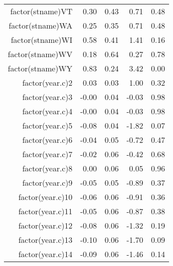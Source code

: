 \begin{table}[ht]
\begin{tabular}{rrrrr}
  factor(stname)VT & 0.30 & 0.43 & 0.71 & 0.48 \\ 
  factor(stname)WA & 0.25 & 0.35 & 0.71 & 0.48 \\ 
  factor(stname)WI & 0.58 & 0.41 & 1.41 & 0.16 \\ 
  factor(stname)WV & 0.18 & 0.64 & 0.27 & 0.78 \\ 
  factor(stname)WY & 0.83 & 0.24 & 3.42 & 0.00 \\ 
  factor(year.c)2 & 0.03 & 0.03 & 1.00 & 0.32 \\ 
  factor(year.c)3 & -0.00 & 0.04 & -0.03 & 0.98 \\ 
  factor(year.c)4 & -0.00 & 0.04 & -0.03 & 0.98 \\ 
  factor(year.c)5 & -0.08 & 0.04 & -1.82 & 0.07 \\ 
  factor(year.c)6 & -0.04 & 0.05 & -0.72 & 0.47 \\ 
  factor(year.c)7 & -0.02 & 0.06 & -0.42 & 0.68 \\ 
  factor(year.c)8 & 0.00 & 0.06 & 0.05 & 0.96 \\ 
  factor(year.c)9 & -0.05 & 0.05 & -0.89 & 0.37 \\ 
  factor(year.c)10 & -0.06 & 0.06 & -0.91 & 0.36 \\ 
  factor(year.c)11 & -0.05 & 0.06 & -0.87 & 0.38 \\ 
  factor(year.c)12 & -0.08 & 0.06 & -1.32 & 0.19 \\ 
  factor(year.c)13 & -0.10 & 0.06 & -1.70 & 0.09 \\ 
  factor(year.c)14 & -0.09 & 0.06 & -1.46 & 0.14 \\ 
   \hline
\end{tabular}
\end{table}
